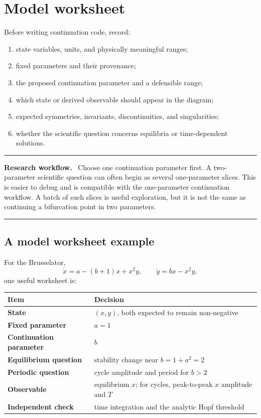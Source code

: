 \documentclass[11pt,oneside]{book}
\newenvironment{workflowbox}
  {\par\medskip\noindent\begin{minipage}{\textwidth}
   \color{JaxGreen!70!black}\rule{\textwidth}{0.8pt}\par
   \textbf{Research workflow.}\ \color{black}}
  {\par\color{JaxGreen!70!black}\rule{\textwidth}{0.8pt}
   \end{minipage}\par\medskip}
\begin{document}
\section{Model worksheet}

Before writing continuation code, record:

\begin{enumerate}
  \item state variables, units, and physically meaningful ranges;
  \item fixed parameters and their provenance;
  \item the proposed continuation parameter and a defensible range;
  \item which state or derived observable should appear in the diagram;
  \item expected symmetries, invariants, discontinuities, and singularities;
  \item whether the scientific question concerns equilibria or time-dependent
        solutions.
\end{enumerate}

\begin{workflowbox}
Choose one continuation parameter first. A two-parameter scientific question
can often begin as several one-parameter slices. This is easier to debug and is
compatible with the one-parameter continuation workflow. A batch of such slices
is useful exploration, but it is not the same as continuing a bifurcation point
in two parameters.
\end{workflowbox}

\subsection{A model worksheet example}

For the Brusselator,
\[
  \dot x=a-(b+1)x+x^2y,\qquad
  \dot y=bx-x^2y,
\]
one useful worksheet is:

\noindent\begin{tabularx}{\textwidth}{>{\bfseries}p{}X}
\toprule
Item & Decision\\
\midrule
State & $(x,y)$, both expected to remain non-negative\\
Fixed parameter & $a=1$\\
Continuation parameter & $b$\\
Equilibrium question & stability change near $b=1+a^2=2$\\
Periodic question & cycle amplitude and period for $b>2$\\
Observable & equilibrium $x$; for cycles, peak-to-peak $x$ amplitude and $T$\\
Independent check & time integration and the analytic Hopf threshold\\
\bottomrule
\end{tabularx}
\end{document}
